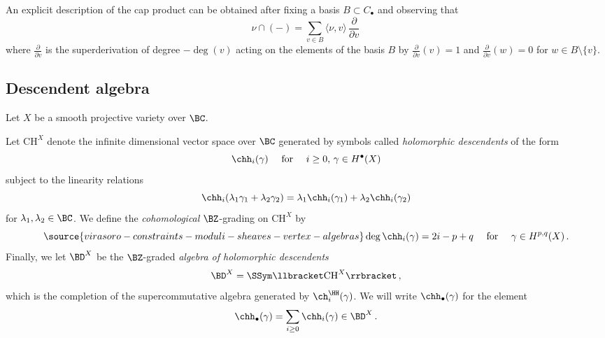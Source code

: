 An explicit description of the cap product can be obtained after fixing a basis $B\subset C_\bullet$ and observing that
$$
\nu \cap (-) = \sum_{v\in B}\langle \nu,v\rangle\, \frac{\partial}{\partial v}\,
$$
where $\frac{\partial}{\partial v}$ is the superderivation of degree $-\deg(v)$ acting on the elements of the basis $B$ by $\frac{\partial}{\partial v}(v)=1$ and $\frac{\partial}{\partial v}(w)=0$ for $w\in B\setminus \{v\}$.

\subsection{Descendent algebra}
\label{sec: descendentalgebra}
Let $X$ be a smooth projective variety over $\BC$.

\begin{definition}
\notready\label{def: descendentalgebra}
Let $\text{CH}^X$ denote the infinite dimensional vector space over $\BC$  generated by symbols called \textit{holomorphic descendents} of the form
\[\chh_i(\gamma)\quad\textup{ for }\quad i\geq 0,\, \gamma\in H^\bullet(X)\]
subject to the linearity relations
\[\chh_i(\lambda_1\gamma_1+\lambda_2\gamma_2)=\lambda_1\chh_i(\gamma_1)+\lambda_2\chh_i(\gamma_2)\]
for $\lambda_1, \lambda_2\in \BC$. We define the \textit{cohomological} $\BZ$-grading on $\text{CH}^X$ by
\begin{equation}
\label{eq: degchigamma}
\source{virasoro-constraints-moduli-sheaves-vertex-algebras}
\deg\chh_i(\gamma) = 2i-p+q \quad \text{ for }\quad \gamma\in H^{p,q}(X)\,.
\end{equation}
Finally, we let $\BD^X$ be the $\BZ$-graded \textit{algebra of holomorphic descendents}
\[\BD^X = \SSym\llbracket\text{CH}^X\rrbracket\,,\]
which is the completion of the supercommutative algebra generated by $\ch_i^\HH(\gamma)$. We will write $\chh_\bullet(\gamma)$ for the element
\[\chh_\bullet(\gamma)=\sum_{i\geq 0}\chh_i(\gamma)\in \BD^X\,.\]
\end{definition}

